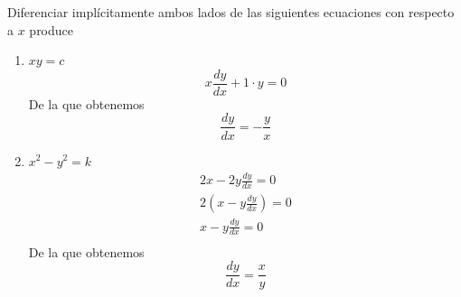 \documentclass[12pt]{article}
\begin{document}
Diferenciar implícitamente ambos lados de las siguientes ecuaciones con respecto a $x$ produce
\begin{enumerate}
\item $xy=c$
  \[ x\frac{dy}{dx}+1\cdot y=0 \]
  De la que obtenemos
  \begin{equation} \label{eqn: d_c_negras}
    \frac{dy}{dx}=-\frac{y}{x}
  \end{equation}

\item $x^2-y^2=k$
  \begin{align*} 
    2x - 2y\frac{dy}{dx}=0\\
    2(x-y\frac{dy}{dx})=0\\
    x-y\frac{dy}{dx}=0\\
  \end{align*}
  De la que obtenemos
  \begin{equation} \label{eqn: d_c_grises}
    \frac{dy}{dx}=\frac{x}{y}
  \end{equation}

\end{enumerate}
\end{document}
